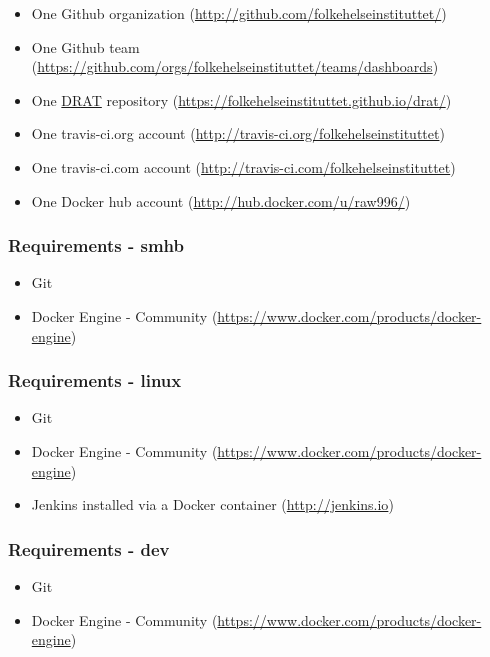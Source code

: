 \documentclass[12pt,]{article}
\providecommand{\tightlist}{%
  \setlength{\itemsep}{0pt}\setlength{\parskip}{0pt}}
\begin{document}
\begin{itemize}
\tightlist
\item
  One Github organization
  (\url{http://github.com/folkehelseinstituttet/})
\item
  One Github team
  (\url{https://github.com/orgs/folkehelseinstituttet/teams/dashboards})
\item
  One \href{https://github.com/eddelbuettel/drat}{DRAT} repository
  (\url{https://folkehelseinstituttet.github.io/drat/})
\item
  One travis-ci.org account
  (\url{http://travis-ci.org/folkehelseinstituttet})
\item
  One travis-ci.com account
  (\url{http://travis-ci.com/folkehelseinstituttet})
\item
  One Docker hub account (\url{http://hub.docker.com/u/raw996/})
\end{itemize}

\subsubsection{Requirements - smhb}\label{requirements---smhb}

\begin{itemize}
\tightlist
\item
  Git
\item
  Docker Engine - Community
  (\url{https://www.docker.com/products/docker-engine})
\end{itemize}

\subsubsection{Requirements - linux}\label{requirements---linux}

\begin{itemize}
\tightlist
\item
  Git
\item
  Docker Engine - Community
  (\url{https://www.docker.com/products/docker-engine})
\item
  Jenkins installed via a Docker container (\url{http://jenkins.io})
\end{itemize}

\subsubsection{Requirements - dev}\label{requirements---dev}

\begin{itemize}
\tightlist
\item
  Git
\item
  Docker Engine - Community
  (\url{https://www.docker.com/products/docker-engine})
\end{itemize}
\end{document}

